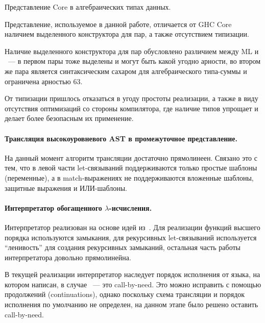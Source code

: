 \begin{listing}
    \inputminted[fontsize=\footnotesize]{haskell}{figures/core.hs}
    \caption{Представление Core в алгебраических типах данных.}
    \label{lst:core}
\end{listing}

Представление, используемое в данной работе, отличается от GHC Core наличием выделенного конструктора для пар, а также отсутствием типизации.

Наличие выделенного конструктора для пар обусловлено различием между ML и \Haskell{}~--- в первом пары тоже выделены и могут быть какой угодно арности, во втором же пара является синтаксическим сахаром для алгебраического типа-суммы и ограничена арностью 63.

От типизации пришлось отказаться в угоду простоты реализации, а также в виду отсутствия оптимизаций со стороны компилятора, где наличие типов упрощает и делает более безопасным их применение.

\paragraph{Трансляция высокоуровневого AST в промежуточное представление.}

На данный момент алгоритм трансляции достаточно прямолинеен.
Связано это с тем, что в левой части let-связываний поддерживаются только простые шаблоны (переменные), а в match-выражениях не поддерживаются вложенные шаблоны, защитные выражения и ИЛИ-шаблоны.

\paragraph{Интерпретатор обогащенного $\lambda$-исчисления.}

Интерпретатор реализован на основе идей из~\cite{reynoldsDefinitionalInterpretersHigherorder1972}.
Для реализации функций высшего порядка используются замыкания, для рекурсивных let-связываний используется \enquote{ленивость} \Haskell{} для создания рекурсивных замыканий, остальная часть работы интерпретатора довольно прямолинейна.

В текущей реализации интерпретатор наследует порядок исполнения от языка, на котором написан, в случае \Haskell{}~--- это call-by-need.
Это можно исправить с помощью продолжений (continuations), однако поскольку схема трансляции и порядок исполнения \INs{} по умолчанию не определен, на данном этапе было решено оставить call-by-need.

